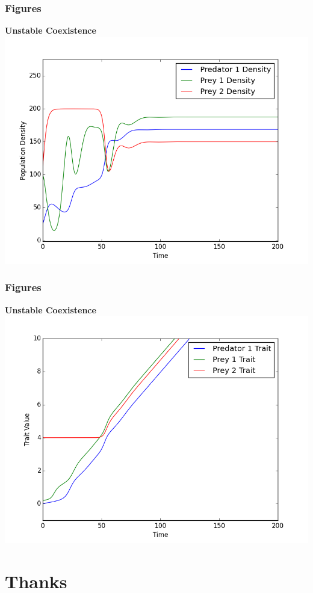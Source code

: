\documentclass[10pt]{beamer}
\begin{document}
\begin{frame}
	\frametitle{Figures}
	{\bf Unstable Coexistence}
	\includegraphics[scale=0.5]{figures/1x2/densities_unstable_coexistence.png}
\end{frame}
\begin{frame}
	\frametitle{Figures}
	{\bf Unstable Coexistence}
	\includegraphics[scale=0.5]{figures/1x2/traits_unstable_coexistence.png}
\end{frame}

\section{Thanks}
\end{document}
